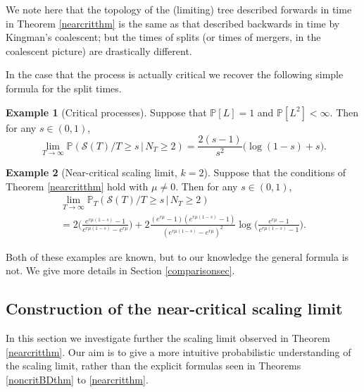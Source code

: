\documentclass{article}
\theoremstyle{plain}
\theoremstyle{definition}
\newtheorem{ex}{Example}
\renewcommand{\P}{\mathbb{P}}
\renewcommand{\S}{\mathcal{S}}
\begin{document}
We note here that the topology of the (limiting) tree described forwards in time in Theorem \ref{nearcritthm} is the same as that described backwards in time by Kingman's coalescent; but the times of splits (or times of mergers, in the coalescent picture) are drastically different.

In the case that the process is actually critical we recover the following simple formula for the split times.

\begin{ex}[Critical processes]
Suppose that $\P[L]=1$ and $\P[L^2]<\infty$. Then for any $s\in(0,1)$,
\begin{equation}\label{critk2}
\lim_{T\to\infty} \P(\S(T)/T \ge s \,|\, N_T\ge 2) = \frac{2(s-1)}{s^2}\big(\log(1-s)+s\big).
\end{equation}
\end{ex}

\begin{ex}[Near-critical scaling limit, $k=2$]\label{nearcritk2}
Suppose that the conditions of Theorem \ref{nearcritthm} hold with $\mu\neq 0$. Then for any $s\in(0,1)$,
\begin{multline*}
\lim_{T\to\infty} \P_T(\S(T)/T \ge s \,|\, N_T\ge 2)\\
 = 2\Big(\frac{e^{r\mu(1-s)}-1}{e^{r\mu(1-s)}-e^{r\mu}}\Big) + 2 \frac{(e^{r\mu}-1)(e^{r\mu(1-s)}-1)}{(e^{r\mu(1-s)}-e^{r\mu})^2} \log\Big(\frac{e^{r\mu}-1}{e^{r\mu(1-s)}-1}\Big).
\end{multline*}
\end{ex}

Both of these examples are known, but to our knowledge the general formula is not. We give more details in Section \ref{comparisonsec}.



\subsection{Construction of the near-critical scaling limit}\label{limitconstructionsec}

In this section we investigate further the scaling limit observed in Theorem \ref{nearcritthm}. Our aim is to give a more intuitive probabilistic understanding of the scaling limit, rather than the explicit formulas seen in Theorems \ref{noncritBDthm} to \ref{nearcritthm}.
\end{document}
